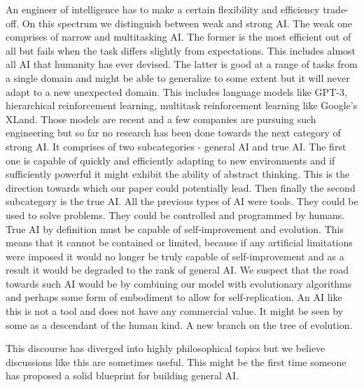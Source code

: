 \documentclass[12pt]{article}
\begin{document}
An engineer of intelligence has to make a certain flexibility and efficiency trade-off.
On this spectrum we distinguish between weak and strong AI. The weak one comprises of 
narrow and multitasking AI. The former is the most efficient out of all but fails when the task differs slightly from expectations. This includes almost all AI that humanity has ever devised. The latter is good at a range of tasks from a single domain and might be able to generalize to some extent but it will never adapt to a new unexpected domain. This includes
language models like GPT-3, hierarchical reinforcement learning, multitask reinforcement learning  like Google's XLand. Those models are recent and a few companies are pursuing such engineering but so far no research has been done towards the next category of strong AI. It comprises of two subcategories - general  AI and true AI. The first one is capable of quickly and efficiently adapting to new environments and if sufficiently powerful it might exhibit the ability of abstract thinking. This is the direction towards which our paper could potentially lead. Then finally the second subcategory is the true AI. All the previous types of AI were tools. They could be used to solve problems. They could be controlled and programmed by humans. True AI by definition must be capable of self-improvement and evolution. This means that it cannot be contained or limited, because if any artificial limitations were  imposed it would no longer be truly capable of self-improvement and as a result it would be degraded to the rank of general AI. We suspect that the road towards such AI would be by combining our model with evolutionary algorithms and perhaps some form of embodiment to allow for self-replication. An AI like this is not a tool and does not have any commercial value. It might be seen by some as a descendant of the human kind. A new branch on the tree of evolution.

This discourse has diverged into highly philosophical topics but we believe discussions like this are sometimes useful. This might be the first time someone has proposed a solid blueprint for building general AI.



 

 
    
\end{document}
